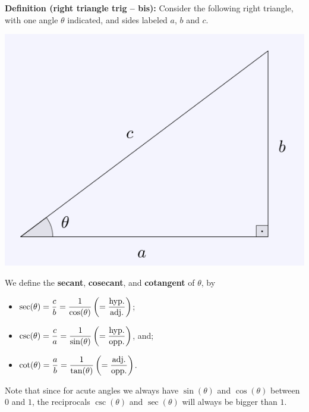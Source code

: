 \documentclass{ximera}
\begin{document}
\begin{callout}
  {\bf Definition (right triangle trig -- bis):} Consider the following right triangle, with one angle $\theta$ indicated, and sides labeled $a$, $b$ and $c$.

  \begin{center}
    \includegraphics[scale=.3]{./figures/9-1-1-defn.png}
  \end{center}

  
  We define the {\bf secant}, {\bf cosecant}, and {\bf cotangent} of $\theta$, by
  \begin{itemize}
  \item $\displaystyle{\sec(\theta) = \frac{c}{b} = \frac{1}{\cos(\theta)} \left(= \frac{\rm hyp.}{\rm adj.}\right)}$;
  \item $\displaystyle{\csc(\theta) = \frac{c}{a}=\frac{1}{\sin(\theta)}\left(=\frac{\rm hyp.}{\rm opp.}\right)}$, and;
  \item $\displaystyle{\cot(\theta) = \frac{a}{b}=\frac{1}{\tan(\theta)} \left(= \frac{\rm adj.}{\rm opp.}\right)}$.
  \end{itemize}
\end{callout}

Note that since for acute angles we always have $\sin(\theta)$ and $\cos(\theta)$ between $0$ and $1$, the reciprocals $\csc(\theta)$ and $\sec(\theta)$ will always be bigger than $1$.
\end{document}
